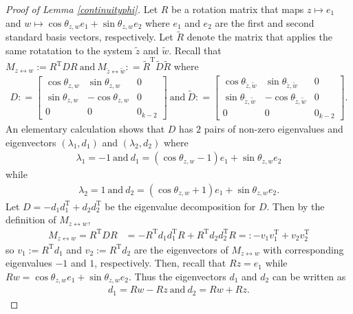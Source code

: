 \documentclass[11pt]{article}
\renewcommand{\top}{{\mathrm{T}}}
\theoremstyle{remark}
\begin{document}
\begin{proof}[Proof of Lemma \ref{continuityphi}]
Let $R$ be a rotation matrix that maps $z \mapsto e_1$ and $w \mapsto \cos \theta_{z,w} e_1 + \sin \theta_{z,w} e_2$ where $e_1$ and $e_2$ are the first and second standard basis vectors, respectively. Let $\tilde{R}$ denote the matrix that applies the same rotatation to the system $\tilde{z}$ and $\tilde{w}$. Recall that $M_{z \leftrightarrow w} := R^\top D R\ \text{and}\  M_{\tilde{z} \leftrightarrow \tilde{w}} : = \tilde{R}^\top \tilde{D} \tilde{R}$ where \begin{align*}
    D : = \left[\begin{array}{ccc}
    \cos\theta_{z,w} & \sin\theta_{z,w} & 0  \\
     \sin \theta_{z,w} & -\cos \theta_{z,w} & 0 \\
     0 & 0 & 0_{k-2}
\end{array}\right]\ \text{and}\ \tilde{D} : = \left[\begin{array}{ccc}
    \cos\theta_{\tilde{z},\tilde{w}} & \sin\theta_{\tilde{z},\tilde{w}} & 0  \\
     \sin\theta_{\tilde{z},\tilde{w}} & -\cos \theta_{\tilde{z},\tilde{w}} & 0 \\
     0 & 0 & 0_{k-2}
\end{array}\right].
\end{align*} An elementary calculation shows that $D$ has $2$ pairs of non-zero eigenvalues and eigenvectors $(\lambda_1, d_1)$ and $(\lambda_2,d_2)$ where \begin{align*}
    \lambda_1 = -1\ \text{and}\ d_1 = (\cos \theta_{z,w} - 1)e_1 + \sin \theta_{z,w}e_2
\end{align*} while \begin{align*}
    \lambda_2 = 1\ \text{and}\ d_2 = (\cos \theta_{z,w} + 1)e_1 + \sin \theta_{z,w} e_2.
\end{align*} Let $D = - d_1d_1^\top +  d_2d_2^\top$ be the eigenvalue decomposition for $D$. Then by the definition of $M_{z \leftrightarrow w}$, \begin{align*}
    M_{z \leftrightarrow w} = R^\top D R
    & = -R^\top d_1 d_1^\top R + R^\top d_2 d_2^\top R 
    =: - v_1 v_1^\top +  v_2 v_2^\top
\end{align*} so $v_1 := R^\top d_1$ and $v_2 := R^\top d_2$ are the eigenvectors of $M_{z \leftrightarrow w}$ with corresponding eigenvalues $-1$ and $1$, respectively. Then, recall that $Rz = e_1$ while $Rw = \cos \theta_{z,w} e_1 + \sin\theta_{z,w} e_2$. Thus the eigenvectors $d_1$ and $d_2$ can be written as \begin{align*}
    d_1 = Rw - Rz\ \text{and}\ d_2 = Rw + Rz.

\end{align*}
\end{proof}
\end{document}
